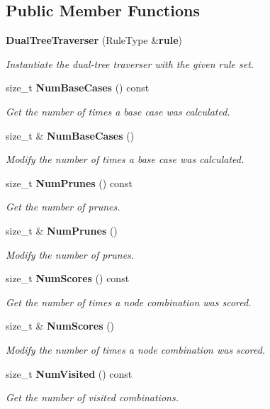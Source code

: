 \subsection*{Public Member Functions}
\begin{DoxyCompactItemize}
\item 
{\bf Dual\+Tree\+Traverser} (Rule\+Type \&{\bf rule})
\begin{DoxyCompactList}\small\item\em Instantiate the dual-\/tree traverser with the given rule set. \end{DoxyCompactList}\item 
size\+\_\+t {\bf Num\+Base\+Cases} () const 
\begin{DoxyCompactList}\small\item\em Get the number of times a base case was calculated. \end{DoxyCompactList}\item 
size\+\_\+t \& {\bf Num\+Base\+Cases} ()
\begin{DoxyCompactList}\small\item\em Modify the number of times a base case was calculated. \end{DoxyCompactList}\item 
size\+\_\+t {\bf Num\+Prunes} () const 
\begin{DoxyCompactList}\small\item\em Get the number of prunes. \end{DoxyCompactList}\item 
size\+\_\+t \& {\bf Num\+Prunes} ()
\begin{DoxyCompactList}\small\item\em Modify the number of prunes. \end{DoxyCompactList}\item 
size\+\_\+t {\bf Num\+Scores} () const 
\begin{DoxyCompactList}\small\item\em Get the number of times a node combination was scored. \end{DoxyCompactList}\item 
size\+\_\+t \& {\bf Num\+Scores} ()
\begin{DoxyCompactList}\small\item\em Modify the number of times a node combination was scored. \end{DoxyCompactList}\item 
size\+\_\+t {\bf Num\+Visited} () const 
\begin{DoxyCompactList}\small\item\em Get the number of visited combinations. \end{DoxyCompactList}\item 

\end{DoxyCompactItemize}
